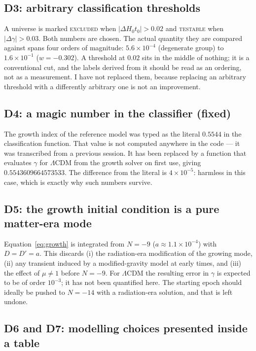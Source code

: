 \documentclass[11pt,a4paper]{article}
\theoremstyle{definition}
\newcommand{\Hzt}{H_0 t_0}
\newcommand{\gamm}{\gamma}
\begin{document}
\subsection{D3: arbitrary classification thresholds}

A universe is marked \textsc{excluded} when $|\Delta\Hzt| > 0.02$ and
\textsc{testable} when $|\Delta\gamm| > 0.03$. Both numbers are chosen. The
actual quantity they are compared against spans four orders of magnitude:
$5.6\times10^{-4}$ (degenerate group) to $1.6\times10^{-1}$ ($w = -0.302$).
A threshold at $0.02$ sits in the middle of nothing; it is a conventional
cut, and the labels derived from it should be read as an ordering, not as a
measurement. I have not replaced them, because replacing an arbitrary
threshold with a differently arbitrary one is not an improvement.

\subsection{D4: a magic number in the classifier (fixed)}

The growth index of the reference model was typed as the literal
$0.5544$ in the classification function. That value is not computed anywhere
in the code --- it was transcribed from a previous session. It has been
replaced by a function that evaluates $\gamm$ for $\Lambda$CDM from the growth
solver on first use, giving $0.5543609664573533$. The difference from the
literal is $4\times10^{-5}$: harmless in this case, which is exactly why such
numbers survive.

\subsection{D5: the growth initial condition is a pure matter-era mode}

Equation~\eqref{eq:growth} is integrated from $N = -9$ ($a \approx 1.1\times
10^{-4}$) with $D = D' = a$. This discards (i) the radiation-era modification
of the growing mode, (ii) any transient induced by a modified-gravity model at
early times, and (iii) the effect of $\mu \neq 1$ before $N = -9$. For
$\Lambda$CDM the resulting error in $\gamm$ is expected to be of order
$10^{-3}$; it has not been quantified here. The starting epoch should ideally
be pushed to $N = -14$ with a radiation-era solution, and that is left undone.

\subsection{D6 and D7: modelling choices presented inside a table}
\end{document}
